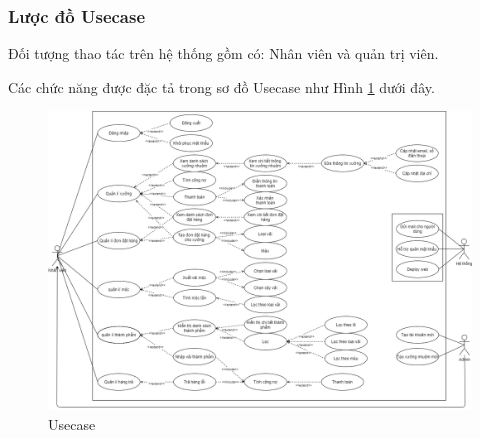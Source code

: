 \subsubsection{Lược đồ Usecase}
Đối tượng thao tác trên hệ thống gồm có: Nhân viên và quản trị viên.\par
Các chức năng được đặc tả trong sơ đồ Usecase như Hình \ref{usecase} dưới đây.
\newpage
\begin{figure}[h!]
    \begin{center}
        \includegraphics[width=16cm]{Image/General/Usecase.png}
        \caption{Usecase}
        \label{usecase}
    \end{center}
\end{figure}

\newpage
